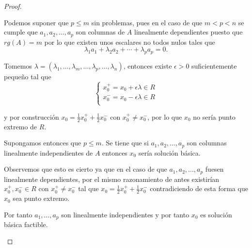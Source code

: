\begin{proof}
\begin{enumerate}
    Podemos suponer que $p\le m$ sin problemas, pues en el caso de que $m<p<n$ se cumple que $a_1,a_2,\dots,a_p$ son columnas de $A$ linealmente dependientes puesto que $rg(A)=m$ por lo que existen unos escalares no todos nulos tales que
    $$\lambda_1 a_1+\lambda_2 a_2+\cdots+\lambda_p a_p=0.$$
		
    Tomemos $\lambda=(\lambda_1,\dots,\lambda_m,\dots,\lambda_p,\dots,\lambda_n)$, entonces existe $\epsilon>0$ suficientemente pequeño tal que
    $$\left\{
      \begin{array}{l}
        x_0^+=x_0+\epsilon\lambda\in R\\
        x_0^-=x_0-\epsilon\lambda\in R\\
      \end{array}
    \right.$$
		
    y por construcción $x_0=\frac{1}{2}x_0^++\frac{1}{2}x_0^-$ con $x_0^+\neq x_0^-$, por lo que $x_0$ no sería punto extremo de $R$.
		
    Supongamos entonces que $p\le m$. Se tiene que si $a_1,a_2,\dots,a_p$ son  columnas linealmente independientes de $A$ entonces $x_0$ sería solución básica. 
		
    Observemos que esto es cierto ya que en el caso de que $a_1,a_2,\dots,a_p$ fuesen linealmente dependientes, por el mismo razonamiento de antes existirían $x_0^+,x_0^-\in R$ con $x_0^+\neq x_0^-$ tal que $x_0=\frac{1}{2}x_0^++\frac{1}{2}x_0^-$ contradiciendo de esta forma que $x_0$ sea punto extremo.
		
    Por tanto $a_1,\dots,a_p$ son linealmente independientes y por tanto $x_0$ es solución básica factible.
  \end{enumerate}
\end{proof}

